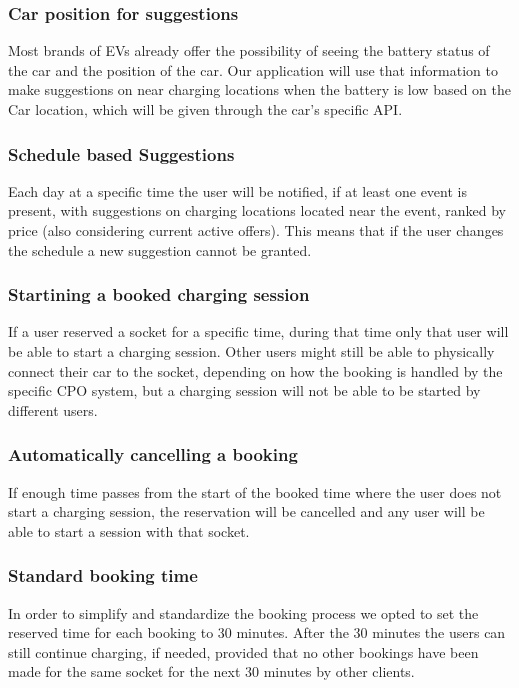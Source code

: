 \documentclass[table, 12pt]{article}
\begin{document}
\subsubsection{Car position for suggestions} 
Most brands of EVs already offer the possibility of seeing the battery status of the car and the position of the car. Our application will use that information to make suggestions on near charging locations when the battery is low based on the Car location, which will be given through the car's specific API.
\subsubsection{Schedule based Suggestions} 
Each day at a specific time the user will be notified, if at least one event is present, with suggestions on charging locations located near the event, ranked by price (also considering current active offers). This means that if the user changes the schedule a new suggestion cannot be granted. 
\subsubsection{Startining a booked charging session}
If a user reserved a socket for a specific time, during that time only that user will be able to start a charging session. Other users might still be able to physically connect their car to the socket, depending on how the booking is handled by the specific CPO system, but a charging session will not be able to be started by different users. 
\subsubsection{Automatically cancelling a booking}
If enough time passes from the start of the booked time where the user does not start a charging session, the reservation will be cancelled and any user will be able to start a session with that socket.
\subsubsection{Standard booking time}
In order to simplify and standardize the booking process we opted to set the reserved time for each booking to 30 minutes. After the 30 minutes the users can still continue charging, if needed, provided that no other bookings have been made for the same socket for the next 30 minutes by other clients.
\newpage
\end{document}
